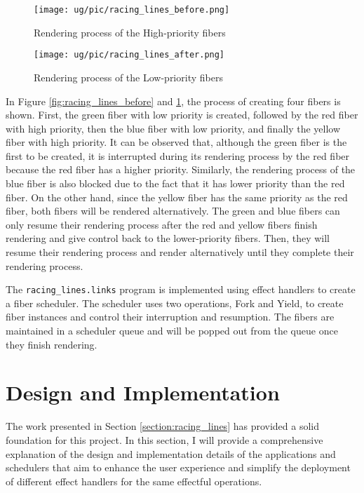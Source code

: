 \documentclass[logo,bsc,singlespacing,parskip]{infthesis}
\begin{document}
\begin{figure}[htbp]
\centering
\begin{minipage}[t]{0.48\textwidth}
\centering
\texttt{[image: ug/pic/racing\_lines\_before.png]}
\caption{Rendering process of the High-priority fibers}
\label{fig:racing_lines_before}
\end{minipage}
\begin{minipage}[t]{0.48\textwidth}
\centering
\texttt{[image: ug/pic/racing\_lines\_after.png]}
\caption{Rendering process of the Low-priority fibers}
\label{fig:racing_lines_after}
\end{minipage}
\end{figure}

In Figure \ref{fig:racing_lines_before} and \ref{fig:racing_lines_after}, the process of creating four fibers is shown. First, the green fiber with low priority is created, followed by the red fiber with high priority, then the blue fiber with low priority, and finally the yellow fiber with high priority. It can be observed that, although the green fiber is the first to be created, it is interrupted during its rendering process by the red fiber because the red fiber has a higher priority. Similarly, the rendering process of the blue fiber is also blocked due to the fact that it has lower priority than the red fiber. On the other hand, since the yellow fiber has the same priority as the red fiber, both fibers will be rendered alternatively. The green and blue fibers can only resume their rendering process after the red and yellow fibers finish rendering and give control back to the lower-priority fibers. Then, they will resume their rendering process and render alternatively until they complete their rendering process.

The \texttt{racing\_lines.links} program is implemented using effect handlers to create a fiber scheduler. The scheduler uses two operations, Fork and Yield, to create fiber instances and control their interruption and resumption. The fibers are maintained in a scheduler queue and will be popped out from the queue once they finish rendering.

\chapter{Design and Implementation}
\label{chap:design_implementation}

The work presented in Section \ref{section:racing_lines} has provided a solid foundation for this project. In this section, I will provide a comprehensive explanation of the design and implementation details of the applications and schedulers that aim to enhance the user experience and simplify the deployment of different effect handlers for the same effectful operations.
\end{document}
